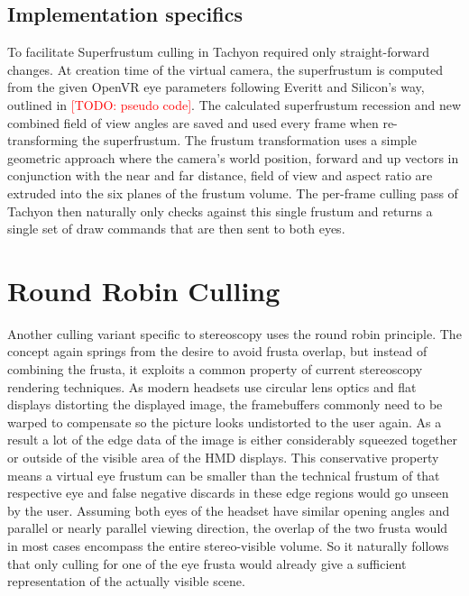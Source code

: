 \subsection{Implementation specifics}
To facilitate Superfrustum culling in Tachyon required only straight-forward changes. At creation time of the virtual camera, the superfrustum is computed from the given OpenVR eye parameters following Everitt and Silicon's way, outlined in \textcolor{red}{[TODO: pseudo code]}. 
The calculated superfrustum recession and new combined field of view angles are saved and used every frame when re-transforming the superfrustum. The frustum transformation uses a simple geometric approach where the camera's world position, forward and up vectors in conjunction with the near and far distance, field of view and aspect ratio are extruded into the six planes of the frustum volume. 
The per-frame culling pass of Tachyon then naturally only checks against this single frustum and returns a single set of draw commands that are then sent to both eyes. 

\section{Round Robin Culling}
Another culling variant specific to stereoscopy uses the round robin principle. The concept again springs from the desire to avoid frusta overlap, but instead of combining the frusta, it exploits a common property of current stereoscopy rendering techniques. As modern headsets use circular lens optics and flat displays distorting the displayed image, the framebuffers commonly need to be warped to compensate so the picture looks undistorted to the user again. As a result a lot of the edge data of the image is either considerably squeezed together or outside of the visible area of the HMD displays.
This conservative property means a virtual eye frustum can be smaller than the technical frustum of that respective eye and false negative discards in these edge regions would go unseen by the user.
Assuming both eyes of the headset have similar opening angles and parallel or nearly parallel viewing direction, the overlap of the two frusta would in most cases encompass the entire stereo-visible volume. So it naturally follows that only culling for one of the eye frusta would already give a sufficient representation of the actually visible scene. \\


